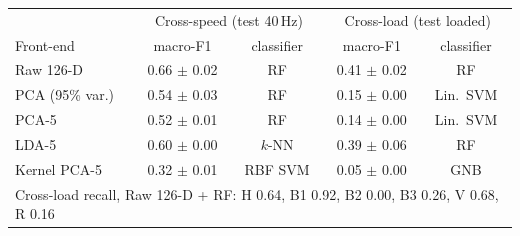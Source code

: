 \begin{tabular}{lcccc}
\toprule
 & \multicolumn{2}{c}{Cross-speed (test 40\,Hz)} & \multicolumn{2}{c}{Cross-load (test loaded)} \\
Front-end & macro-F1 & classifier & macro-F1 & classifier \\
\midrule
Raw 126-D & 0.66 $\pm$ 0.02 & RF & 0.41 $\pm$ 0.02 & RF \\
PCA (95\% var.) & 0.54 $\pm$ 0.03 & RF & 0.15 $\pm$ 0.00 & Lin.\ SVM \\
PCA-5 & 0.52 $\pm$ 0.01 & RF & 0.14 $\pm$ 0.00 & Lin.\ SVM \\
LDA-5 & 0.60 $\pm$ 0.00 & $k$-NN & 0.39 $\pm$ 0.06 & RF \\
Kernel PCA-5 & 0.32 $\pm$ 0.01 & RBF SVM & 0.05 $\pm$ 0.00 & GNB \\
\midrule
\multicolumn{5}{l}{Cross-load recall, Raw 126-D + RF: H 0.64, B1 0.92, B2 0.00, B3 0.26, V 0.68, R 0.16} \\
\bottomrule
\end{tabular}
